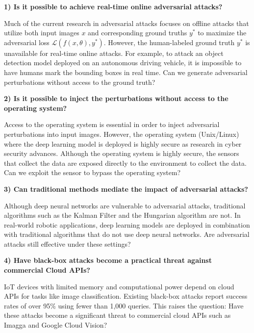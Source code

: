 \vspace{0.5cm}

\textbf{1) Is it possible to achieve real-time online adversarial attacks?}

Much of the current research in adversarial attacks focuses on offline attacks that utilize both input images $x$ and corresponding ground truths $y^*$ to maximize the adversarial loss $\mathcal{L}(f(x, \theta), y^*)$. However, the human-labeled ground truth $y^*$ is unavailable for real-time online attacks. For example, to attack an object detection model deployed on an autonomous driving vehicle, it is impossible to have humans mark the bounding boxes in real time. Can we generate adversarial perturbations without access to the ground truth?

\vspace{0.5cm}

\textbf{2) Is it possible to inject the perturbations without access to the operating system?}

Access to the operating system is essential in order to inject adversarial perturbations into input images. However, the operating system (Unix/Linux) where the deep learning model is deployed is highly secure as research in cyber security advances. Although the operating system is highly secure, the sensors that collect the data are exposed directly to the environment to collect the data. Can we exploit the sensor to bypass the operating system?

\vspace{0.5cm}

\textbf{3) Can traditional methods mediate the impact of adversarial attacks?}

Although deep neural networks are vulnerable to adversarial attacks, traditional algorithms such as the Kalman Filter and the Hungarian algorithm are not. In real-world robotic applications, deep learning models are deployed in combination with traditional algorithms that do not use deep neural networks. Are adversarial attacks still effective under these settings?

\clearpage

\textbf{4) Have black-box attacks become a practical threat against commercial Cloud APIs?}
\label{question_4}

IoT devices with limited memory and computational power depend on cloud APIs for tasks like image classification. Existing black-box attacks report success rates of over 95\% using fewer than 1,000 queries. This raises the question: Have these attacks become a significant threat to commercial cloud APIs such as Imagga and Google Cloud Vision?

